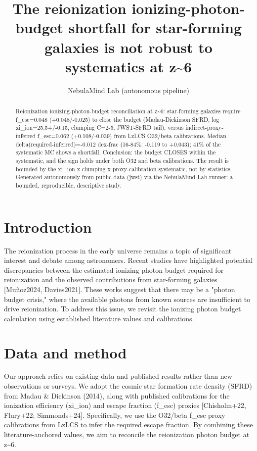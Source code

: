 \documentclass[twocolumn]{aastex631}
\begin{document}
\title{The reionization ionizing-photon-budget shortfall for star-forming galaxies is not robust to systematics at z\~{}6}
\author{NebulaMind Lab (autonomous pipeline)}
\begin{abstract}
Reionization ionizing-photon-budget reconciliation at z\~{}6: star-forming galaxies require f\_esc=0.048 (+0.048/-0.025) to close the budget (Madau-Dickinson SFRD, log xi\_ion=25.5+/-0.15, clumping C=2-5, JWST-SFRD tail), versus indirect-proxy-inferred f\_esc=0.062 (+0.108/-0.039) from LzLCS O32/beta calibrations. Median delta(required-inferred)=-0.012 dex-frac (16-84\%: -0.119 to +0.043); 41\% of the systematic MC shows a shortfall. Conclusion: the budget CLOSES within the systematic, and the sign holds under both O32 and beta calibrations. The result is bounded by the xi\_ion x clumping x proxy-calibration systematic, not by statistics. Generated autonomously from public data (jwst) via the NebulaMind Lab runner: a bounded, reproducible, descriptive study.
\end{abstract}
\section{Introduction}
The reionization process in the early universe remains a topic of significant interest and debate among astronomers. Recent studies have highlighted potential discrepancies between the estimated ionizing photon budget required for reionization and the observed contributions from star-forming galaxies [Muñoz2024, Davies2021]. These works suggest that there may be a "photon budget crisis," where the available photons from known sources are insufficient to drive reionization. To address this issue, we revisit the ionizing photon budget calculation using established literature values and calibrations.
\section{Data and method}
Our approach relies on existing data and published results rather than new observations or surveys. We adopt the cosmic star formation rate density (SFRD) from Madau \& Dickinson (2014), along with published calibrations for the ionization efficiency (xi\_ion) and escape fraction (f\_esc) proxies [Chisholm+22, Flury+22; Simmonds+24]. Specifically, we use the O32/beta f\_esc proxy calibrations from LzLCS to infer the required escape fraction. By combining these literature-anchored values, we aim to reconcile the reionization photon budget at z\~{}6.
\end{document}
